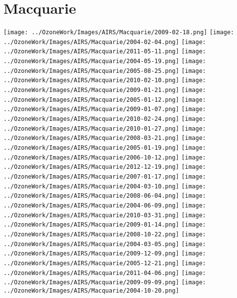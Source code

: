 \section{Macquarie}
  \texttt{[image: ../OzoneWork/Images/AIRS/Macquarie/2009-02-18.png]}
  \texttt{[image: ../OzoneWork/Images/AIRS/Macquarie/2004-02-04.png]}
  \texttt{[image: ../OzoneWork/Images/AIRS/Macquarie/2011-05-11.png]}
  \texttt{[image: ../OzoneWork/Images/AIRS/Macquarie/2004-05-19.png]}
  \texttt{[image: ../OzoneWork/Images/AIRS/Macquarie/2005-08-25.png]}
  \texttt{[image: ../OzoneWork/Images/AIRS/Macquarie/2010-02-10.png]}
  \texttt{[image: ../OzoneWork/Images/AIRS/Macquarie/2009-01-21.png]}
  \texttt{[image: ../OzoneWork/Images/AIRS/Macquarie/2005-01-12.png]}
  \texttt{[image: ../OzoneWork/Images/AIRS/Macquarie/2009-01-07.png]}
  \texttt{[image: ../OzoneWork/Images/AIRS/Macquarie/2010-02-24.png]}
  \texttt{[image: ../OzoneWork/Images/AIRS/Macquarie/2010-01-27.png]}
  \texttt{[image: ../OzoneWork/Images/AIRS/Macquarie/2008-03-21.png]}
  \texttt{[image: ../OzoneWork/Images/AIRS/Macquarie/2005-01-19.png]}
  \texttt{[image: ../OzoneWork/Images/AIRS/Macquarie/2006-10-12.png]}
  \texttt{[image: ../OzoneWork/Images/AIRS/Macquarie/2012-12-19.png]}
  \texttt{[image: ../OzoneWork/Images/AIRS/Macquarie/2007-01-17.png]}
  \texttt{[image: ../OzoneWork/Images/AIRS/Macquarie/2004-03-10.png]}
  \texttt{[image: ../OzoneWork/Images/AIRS/Macquarie/2008-06-04.png]}
  \texttt{[image: ../OzoneWork/Images/AIRS/Macquarie/2004-06-09.png]}
  \texttt{[image: ../OzoneWork/Images/AIRS/Macquarie/2010-03-31.png]}
  \texttt{[image: ../OzoneWork/Images/AIRS/Macquarie/2009-01-14.png]}
  \texttt{[image: ../OzoneWork/Images/AIRS/Macquarie/2008-10-22.png]}
  \texttt{[image: ../OzoneWork/Images/AIRS/Macquarie/2004-03-05.png]}
  \texttt{[image: ../OzoneWork/Images/AIRS/Macquarie/2009-12-09.png]}
  \texttt{[image: ../OzoneWork/Images/AIRS/Macquarie/2005-12-21.png]}
  \texttt{[image: ../OzoneWork/Images/AIRS/Macquarie/2011-04-06.png]}
  \texttt{[image: ../OzoneWork/Images/AIRS/Macquarie/2009-09-09.png]}
  \texttt{[image: ../OzoneWork/Images/AIRS/Macquarie/2004-10-20.png]}
